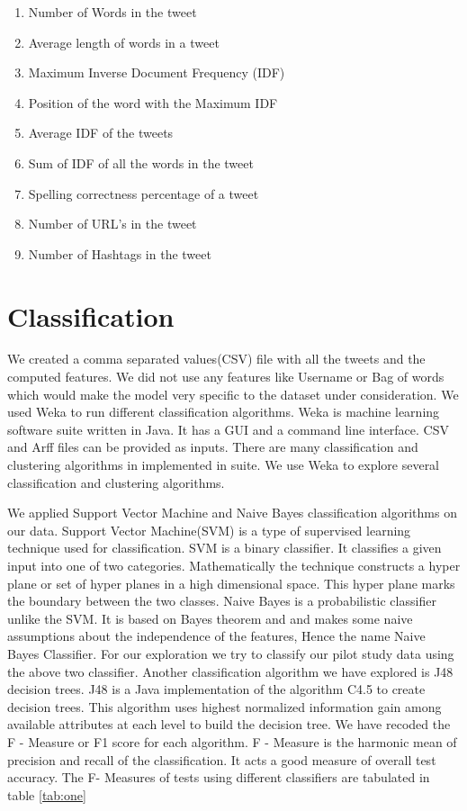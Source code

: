 \begin{enumerate}
\item Number of Words in the tweet
\item Average length of words in a tweet
\item Maximum Inverse Document Frequency (IDF)
\item Position of the word with the Maximum IDF
\item Average IDF of the tweets
\item Sum of IDF of all the words in the tweet
\item Spelling correctness percentage of  a tweet
\item Number of URL’s in the tweet
\item Number of Hashtags in the tweet
\end{enumerate}

\section{Classification}
We created a comma separated values(CSV) file with all the tweets and the computed features. We did not use any features like Username or Bag of words which would make the model very specific to the dataset under consideration. We used Weka \cite{DBLP:journals/sigkdd/HallFHPRW09} to run different classification algorithms. Weka is machine learning software suite written in Java. It has a GUI and a command line interface. CSV and Arff files can be provided as inputs. There are many classification and clustering algorithms in implemented in suite. We use Weka to explore several classification and clustering algorithms.

We applied Support Vector Machine and Naive Bayes classification algorithms on our data. Support Vector Machine(SVM) is a type of supervised learning technique used for classification. SVM is a binary classifier. It classifies a given input into one of two categories. Mathematically the technique constructs a hyper plane  or set of hyper planes in a high dimensional space. This hyper plane marks the boundary between the two classes. Naive Bayes is a probabilistic classifier unlike the SVM. It is based on Bayes theorem and and makes some naive assumptions about the independence of the features, Hence the name Naive Bayes Classifier. For our exploration we try to classify our pilot study data using the above two classifier. Another classification algorithm we have explored is J48 decision trees. J48 is a Java implementation of the algorithm C4.5 to create decision trees.  This algorithm uses highest normalized information gain among available attributes at each level to build the decision tree. We have recoded the F - Measure or F1 score for each algorithm.  F - Measure is the harmonic mean of precision and recall of the classification. It acts a good measure of overall test accuracy. The F- Measures of tests using different classifiers are tabulated in table \ref{tab:one}


